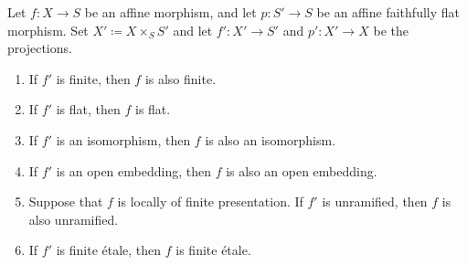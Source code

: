 \documentclass{amsart}
\begin{document}
\begin{proposition} \label{prop:descent}
    Let $f\colon X\to S$ be an affine morphism, and let $p\colon S'\to S$ be an affine faithfully flat morphism. Set $X'\coloneqq X\times_SS'$ and let $f'\colon X'\to S'$ and $p'\colon X'\to X$ be the projections.
    \begin{enumerate}[label=(\alph*)]
        \item If $f'$ is finite, then $f$ is also finite.
        \item If $f'$ is flat, then $f$ is flat.
        \item If $f'$ is an isomorphism, then $f$ is also an isomorphism.
        \item If $f'$ is an open embedding, then $f$ is also an open embedding.
        \item Suppose that $f$ is locally of finite presentation. If $f'$ is unramified, then $f$ is also unramified.
        \item If $f'$ is finite \'etale, then $f$ is finite \'etale.
    \end{enumerate}
\end{proposition}
\end{document}
